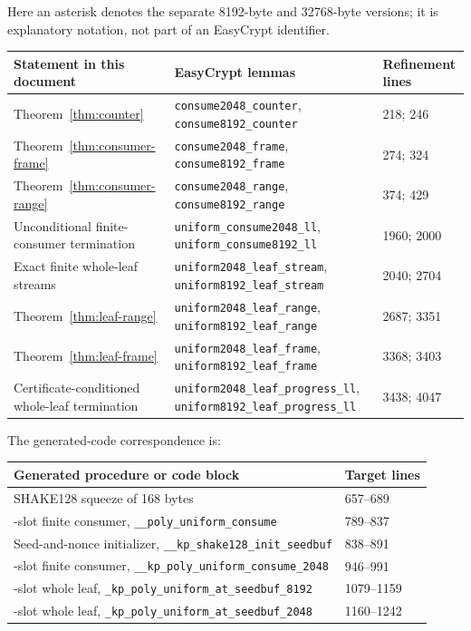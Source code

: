 \documentclass[11pt]{article}
\theoremstyle{definition}
\theoremstyle{plain}
\theoremstyle{remark}
\newcommand{\code}[1]{\nolinkurl{#1}}
\begin{document}
Here an asterisk denotes the separate 8192-byte and 32768-byte versions; it
is explanatory notation, not part of an EasyCrypt identifier.

\begin{center}
\small
\begin{tabularx}{0.98\textwidth}{>{\raggedright\arraybackslash}p{}
                                  >{\raggedright\arraybackslash}p{}X}
\toprule
Statement in this document & EasyCrypt lemmas & Refinement lines \\
\midrule
Theorem~\ref{thm:counter} & \code{consume2048_counter}, \code{consume8192_counter} & 218; 246 \\
Theorem~\ref{thm:consumer-frame} & \code{consume2048_frame}, \code{consume8192_frame} & 274; 324 \\
Theorem~\ref{thm:consumer-range} & \code{consume2048_range}, \code{consume8192_range} & 374; 429 \\
Unconditional finite-consumer termination & \code{uniform_consume2048_ll}, \code{uniform_consume8192_ll} & 1960; 2000 \\
Exact finite whole-leaf streams & \code{uniform2048_leaf_stream}, \code{uniform8192_leaf_stream} & 2040; 2704 \\
Theorem~\ref{thm:leaf-range} & \code{uniform2048_leaf_range}, \code{uniform8192_leaf_range} & 2687; 3351 \\
Theorem~\ref{thm:leaf-frame} & \code{uniform2048_leaf_frame}, \code{uniform8192_leaf_frame} & 3368; 3403 \\
Certificate-conditioned whole-leaf termination & \code{uniform2048_leaf_progress_ll}, \code{uniform8192_leaf_progress_ll} & 3438; 4047 \\
\bottomrule
\end{tabularx}
\end{center}

The generated-code correspondence is:
\begin{center}
\small
\begin{tabularx}{0.98\textwidth}{>{\raggedright\arraybackslash}p{}X}
\toprule
Generated procedure or code block & Target lines \\
\midrule
SHAKE128 squeeze of 168 bytes & 657--689 \\
8192-slot finite consumer, \code{__poly_uniform_consume} & 789--837 \\
Seed-and-nonce initializer, \code{__kp_shake128_init_seedbuf} & 838--891 \\
2048-slot finite consumer, \code{__kp_poly_uniform_consume_2048} & 946--991 \\
8192-slot whole leaf, \code{_kp_poly_uniform_at_seedbuf_8192} & 1079--1159 \\
2048-slot whole leaf, \code{_kp_poly_uniform_at_seedbuf_2048} & 1160--1242 \\
\bottomrule
\end{tabularx}
\end{center}
\end{document}
